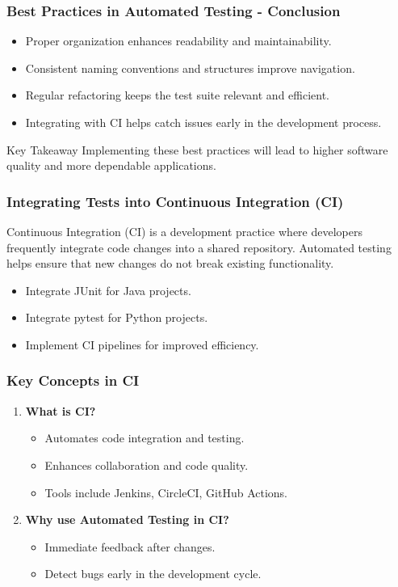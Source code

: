 \documentclass{beamer}
\begin{document}
\begin{frame}[fragile]
    \frametitle{Best Practices in Automated Testing - Conclusion}
    \begin{itemize}
        \item Proper organization enhances readability and maintainability.
        \item Consistent naming conventions and structures improve navigation.
        \item Regular refactoring keeps the test suite relevant and efficient.
        \item Integrating with CI helps catch issues early in the development process.
    \end{itemize}
    \begin{block}{Key Takeaway}
        Implementing these best practices will lead to higher software quality and more dependable applications.
    \end{block}
\end{frame}

\begin{frame}[fragile]
    \frametitle{Integrating Tests into Continuous Integration (CI)}
    Continuous Integration (CI) is a development practice where developers frequently integrate code changes into a shared repository. Automated testing helps ensure that new changes do not break existing functionality.
    \begin{itemize}
        \item Integrate JUnit for Java projects.
        \item Integrate pytest for Python projects.
        \item Implement CI pipelines for improved efficiency.
    \end{itemize}
\end{frame}

\begin{frame}[fragile]
    \frametitle{Key Concepts in CI}
    \begin{enumerate}
        \item \textbf{What is CI?}
        \begin{itemize}
            \item Automates code integration and testing.
            \item Enhances collaboration and code quality.
            \item Tools include Jenkins, CircleCI, GitHub Actions.
        \end{itemize}
        
        \item \textbf{Why use Automated Testing in CI?}
        \begin{itemize}
            \item Immediate feedback after changes.
            \item Detect bugs early in the development cycle.
        \end{itemize}
    \end{enumerate}
\end{frame}
\end{document}
